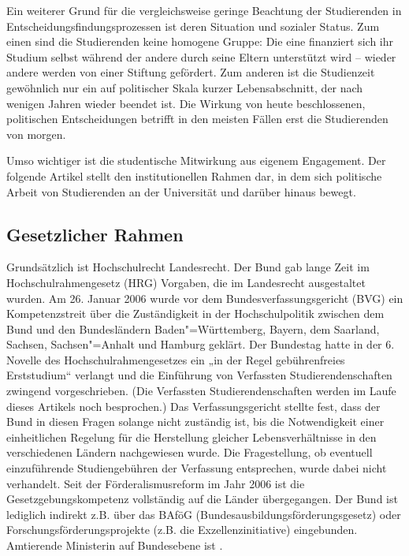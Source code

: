 Ein weiterer Grund für die vergleichsweise geringe Beachtung der
Studierenden in Entscheidungsfindungsprozessen ist deren Situation und
sozialer Status. Zum einen sind die Studierenden keine homogene Gruppe:
Die eine finanziert sich ihr Studium selbst während der andere durch seine
Eltern unterstützt wird -- wieder andere werden von
einer Stiftung gefördert. Zum anderen ist die Studienzeit gewöhnlich nur
ein auf politischer Skala kurzer Lebensabschnitt, der nach wenigen Jahren
wieder beendet ist. Die Wirkung von heute beschlossenen, politischen
Entscheidungen betrifft in den meisten Fällen erst die Studierenden von
morgen.

Umso wichtiger ist die studentische Mitwirkung aus eigenem Engagement. Der
folgende Artikel stellt den institutionellen Rahmen dar, in dem sich
politische Arbeit von Studierenden an der Universität und darüber hinaus
bewegt.

\subsection{Gesetzlicher Rahmen}
Grundsätzlich ist Hochschulrecht Landesrecht. Der Bund gab lange Zeit im
Hochschulrahmengesetz (HRG) Vorgaben, die im Landesrecht ausgestaltet
wurden. Am 26. Januar 2006 wurde vor dem Bundesverfassungsgericht (BVG)
ein Kompetenzstreit über die Zuständigkeit in der Hochschulpolitik
zwischen dem Bund und den Bundesländern Baden"=Württemberg, Bayern, dem
Saarland, Sachsen, Sachsen"=Anhalt und Hamburg geklärt. Der Bundestag hatte
in der 6. Novelle des Hochschulrahmengesetzes ein „in der Regel
gebührenfreies Erststudium“ verlangt und die Einführung von Verfassten
Studierendenschaften zwingend vorgeschrieben. (Die Verfassten
Studierendenschaften werden im Laufe dieses Artikels noch besprochen.) Das
Verfassungsgericht stellte fest, dass der Bund in diesen Fragen solange
nicht zuständig ist, bis die Notwendigkeit einer einheitlichen Regelung
für die Herstellung gleicher Lebensverhältnisse in den verschiedenen
Ländern nachgewiesen wurde. Die Fragestellung, ob eventuell einzuführende
Studiengebühren der Verfassung entsprechen, wurde dabei nicht verhandelt.
Seit der Förderalismusreform im Jahr 2006 ist die Gesetzgebungskompetenz
vollständig auf die Länder übergegangen. Der Bund ist lediglich indirekt
z.B. über das BAföG (Bundesausbildungsförderungsgesetz) oder
Forschungsförderungsprojekte (z.B. die Exzellenzinitiative) eingebunden.
Amtierende Ministerin auf Bundesebene ist \wissenschaftsministerbund.


